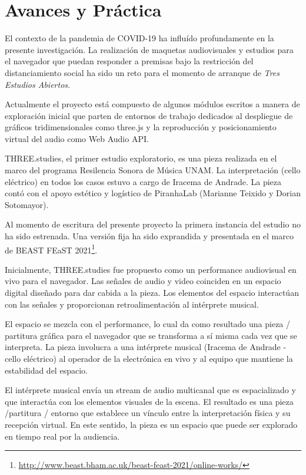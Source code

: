 \section*{Avances y Práctica}

El contexto de la pandemia de COVID-19 ha influído profundamente en la presente investigación. La realización de maquetas audiovisuales y estudios para el navegador que puedan responder a premisas bajo la restricción del distanciamiento social ha sido un reto para el momento de arranque de \textit{Tres Estudios Abiertos}. 

Actualmente el proyecto está compuesto de algunos módulos escritos a manera de exploración inicial que parten de entornos de trabajo dedicados al despliegue de gráficos tridimensionales como three.js y la reproducción y posicionamiento virtual del audio como Web Audio API. 

THREE.studies, el primer estudio exploratorio, es una pieza realizada en el marco del programa Resilencia Sonora de Música UNAM. La interpretación (cello eléctrico) en todos los casos estuvo a cargo de Iracema de Andrade. La pieza contó con el apoyo estético y logístico de PiranhaLab (Marianne Teixido y Dorian Sotomayor). 

Al momento de escritura del presente proyecto la primera instancia del estudio no ha sido estrenada. Una versión fija ha sido exprandida y presentada en el marco de  BEAST FEaST 2021\footnote{\url{http://www.beast.bham.ac.uk/beast-feast-2021/online-works/}}.

Inicialmente, THREE.studies fue propuesto como un performance audiovisual en vivo para el navegador. Las señales de audio y video coinciden en un espacio digital diseñado para dar cabida a la pieza. Los elementos del espacio interactúan con las señales y proporcionan retroalimentación al intérprete musical.

El espacio se mezcla con el performance, lo cual da como resultado una pieza / partitura gráfica para el navegador que se transforma a sí misma cada vez que se interpreta. La pieza involucra a una intérprete musical (Iracema de Andrade - cello eléctrico) al operador de la electrónica en vivo y al equipo que mantiene la estabilidad del espacio. 

El intérprete musical envía un stream de audio multicanal que es espacializado y que interactúa con los elementos visuales de la escena. El resultado es una pieza /partitura / entorno que establece un vínculo entre la interpretación física y su recepción virtual. En este sentido, la pieza es un espacio que puede ser explorado en tiempo real por la audiencia. 

